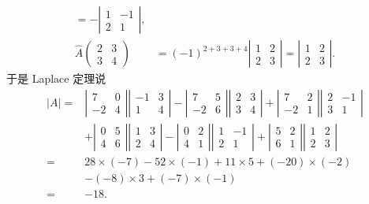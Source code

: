 \documentclass[UTF8,12pt,a4paper,fontset=fandol]{ctexart}
\begin{document}
\[\begin{array}{rl}
=-\left|\begin{array}{cc}1&-1\\2&1\end{array}\right|,\\[1.2em]
\widehat{A}\left(\begin{array}{cc}2&3\\3&4\end{array}\right)
&=(-1)^{2+3+3+4}\left|\begin{array}{cc}1&2\\2&3\end{array}\right|
=\left|\begin{array}{cc}1&2\\2&3\end{array}\right|.
\end{array}
\]
于是 Laplace 定理说
\[
\begin{aligned}
|A|={}&
\left|\begin{array}{cc}7&0\\-2&4\end{array}\right|
\left|\begin{array}{cc}-1&3\\1&4\end{array}\right|
-
\left|\begin{array}{cc}7&5\\-2&6\end{array}\right|
\left|\begin{array}{cc}2&3\\3&4\end{array}\right|
+
\left|\begin{array}{cc}7&2\\-2&1\end{array}\right|
\left|\begin{array}{cc}2&-1\\3&1\end{array}\right|\\
&+
\left|\begin{array}{cc}0&5\\4&6\end{array}\right|
\left|\begin{array}{cc}1&3\\2&4\end{array}\right|
-
\left|\begin{array}{cc}0&2\\4&1\end{array}\right|
\left|\begin{array}{cc}1&-1\\2&1\end{array}\right|
+
\left|\begin{array}{cc}5&2\\6&1\end{array}\right|
\left|\begin{array}{cc}1&2\\2&3\end{array}\right|\\
= {}& 28\times(-7)-52\times(-1)+11\times5+(-20)\times(-2)\\
&-(-8)\times3+(-7)\times(-1)\\
= {}& -18.
\end{aligned}
\]
\end{document}
